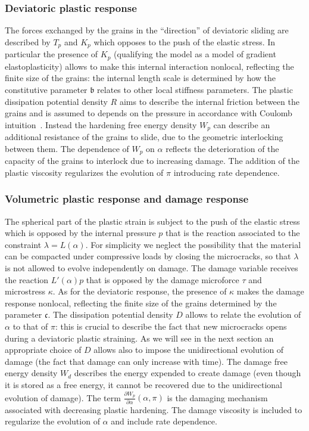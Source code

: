 \documentclass[a4paper,10pt,twoside]{amsbook}
\numberwithin{section}{chapter}
\numberwithin{equation}{chapter}
\theoremstyle{definition}
\newcommand{\dind}[2]{\frac{\partial #1}{\partial #2}}
\begin{document}
\subsubsection*{Deviatoric plastic response} The forces exchanged by the grains in the ``direction'' of deviatoric sliding are described by $T_p$ and $K_p$ which opposes to the push of the elastic stress. In particular the presence of $K_p$ (qualifying the model as a model of gradient elastoplasticity) allows to make this internal interaction nonlocal, reflecting the finite size of the grains: the internal length scale is determined by how the constitutive parameter $\mathfrak{b}$ relates to other local stiffness parameters. The plastic dissipation potential density $R$ aims to describe the internal friction between the grains and is assumed to depends on the pressure in accordance with Coulomb intuition~\cite{Coulomb1776}. Instead the hardening free energy density $W_p$ can describe an additional resistance of the grains to slide, due to the geometric interlocking between them. The dependence of $W_p$ on $\alpha$ reflects the deterioration of the capacity of the grains to interlock due to increasing damage. The addition of the plastic viscosity regularizes the evolution of $\pi$ introducing rate dependence.

\subsubsection*{Volumetric plastic response and damage response}

The spherical part of the plastic strain is subject to the push of the elastic stress which is opposed by the internal pressure $p$ that is the reaction associated to the constraint $\lambda=L(\alpha)$. For simplicity we neglect the possibility that the material can be compacted under compressive loads by closing the microcracks, so that $\lambda$ is not allowed to evolve independently on damage. The damage variable receives the reaction $L'(\alpha)p$ that is opposed by the damage microforce $\tau$ and microstress $\kappa$. As for the deviatoric response, the presence of $\kappa$ makes the damage response nonlocal, reflecting the finite size of the grains determined by the parameter $\mathfrak{c}$. The dissipation potential density $D$ allows to relate the evolution of $\alpha$ to that of $\pi$: this is crucial to describe the fact that new microcracks opens during a deviatoric plastic straining. As we will see in the next section an appropriate choice of $D$ allows also to impose the unidirectional evolution of damage (the fact that damage can only increase with time). The damage free energy density $W_d$ describes the energy expended to create damage (even though it is stored as a free energy, it cannot be recovered due to the unidirectional evolution of damage). The term $\dind{W_p}{\alpha}(\alpha,\pi)$ is the damaging mechanism associated with decreasing plastic hardening. The damage viscosity is included to regularize the evolution of $\alpha$ and include rate dependence.
\end{document}
